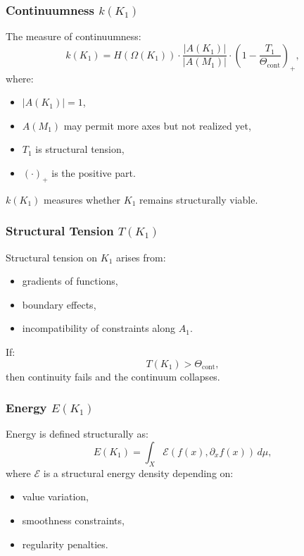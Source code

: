 \subsubsection{Continuumness \texorpdfstring{$k(K_1)$}{k(K_1)}}

The measure of continuumness:
\[
k(K_1) =
H(\Omega(K_1)) \cdot
\frac{|A(K_1)|}{|A(M_1)|} \cdot
(1 - \frac{T_1}{\Theta_{\mathrm{cont}}})_+,
\]
where:
\begin{itemize}
    \item $|A(K_1)| = 1$,
    \item $A(M_1)$ may permit more axes but not realized yet,
    \item $T_1$ is structural tension,
    \item $(\cdot)_+$ is the positive part.
\end{itemize}

$k(K_1)$ measures whether $K_1$ remains structurally viable.

\subsubsection{Structural Tension \texorpdfstring{$T(K_1)$}{T(K_1)}}

Structural tension on $K_1$ arises from:
\begin{itemize}
    \item gradients of functions,
    \item boundary effects,
    \item incompatibility of constraints along $A_1$.
\end{itemize}

If:
\[
T(K_1) > \Theta_{\mathrm{cont}},
\]
then continuity fails and the continuum collapses.

\subsubsection{Energy \texorpdfstring{$E(K_1)$}{E(K_1)}}

Energy is defined structurally as:
\[
E(K_1) = \int_X \mathcal{E}(f(x), \partial_x f(x))\, d\mu,
\]
where $\mathcal{E}$ is a structural energy density depending on:
\begin{itemize}
    \item value variation,
    \item smoothness constraints,
    \item regularity penalties.
\end{itemize}

